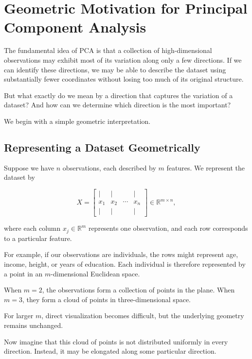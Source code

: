\documentclass[11pt]{article}
\begin{document}
\section{Geometric Motivation for Principal
Component Analysis}


The fundamental idea of PCA is that a collection of
high-dimensional observations may exhibit most
of its variation along only a few directions.
If we can identify these directions, we may be
able to describe the dataset using substantially
fewer coordinates without losing too much of
its original structure.

But what exactly do we mean by a direction
that captures the variation of a dataset?
And how can we determine which direction
is the most important?

We begin with a simple geometric interpretation.

\subsection{Representing a Dataset Geometrically}

Suppose we have $n$ observations, each described
by $m$ features. We represent the dataset by

\[
X =
\begin{bmatrix}
| & | & & |\\
x_1 & x_2 & \cdots & x_n\\
| & | & & |
\end{bmatrix}
\in \mathbb{R}^{m\times n},
\]

where each column $x_j\in\mathbb{R}^m$
represents one observation, and each row
corresponds to a particular feature.

For example, if our observations are individuals,
the rows might represent age, income, height,
or years of education. Each individual is
therefore represented by a point in an
$m$-dimensional Euclidean space.

When $m=2$, the observations form a collection
of points in the plane. When $m=3$, they form
a cloud of points in three-dimensional space.

For larger $m$, direct visualization becomes
difficult, but the underlying geometry
remains unchanged.

Now imagine that this cloud of points is
not distributed uniformly in every direction.
Instead, it may be elongated along some
particular direction.
\end{document}
